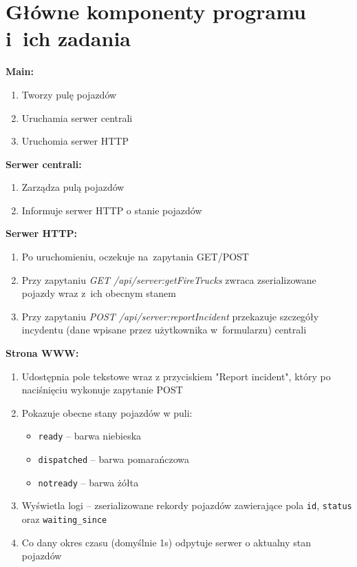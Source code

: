 \documentclass{article}
\begin{document}
\section{Główne komponenty programu i~ich zadania}
\textbf{Main:}
\begin{enumerate}
	\item Tworzy pulę pojazdów
	\item Uruchamia serwer centrali
	\item Uruchomia serwer HTTP
\end{enumerate}

\textbf{Serwer centrali:}
\begin{enumerate}
	\item Zarządza pulą pojazdów
	\item Informuje serwer HTTP o stanie pojazdów
\end{enumerate}

\textbf{Serwer HTTP:}
\begin{enumerate}
	\item Po uruchomieniu, oczekuje na~zapytania GET/POST
	\item Przy zapytaniu \emph{GET /api/server:getFireTrucks} zwraca zserializowane pojazdy wraz z~ich obecnym stanem
	\item Przy zapytaniu \emph{POST /api/server:reportIncident} przekazuje szczegóły incydentu (dane wpisane przez użytkownika w~formularzu) centrali
\end{enumerate}

\textbf{Strona WWW:}
\begin{enumerate}
	\item Udostępnia pole tekstowe wraz z przyciskiem "Report incident", który po naciśnięciu wykonuje zapytanie POST
	\item Pokazuje obecne stany pojazdów w puli:
		\begin{itemize}
			\item \texttt{ready} -- barwa niebieska
			\item \texttt{dispatched} -- barwa pomarańczowa
			\item \texttt{notready} -- barwa żółta
		\end{itemize}
	\item Wyświetla logi -- zserializowane rekordy pojazdów zawierające pola \texttt{id}, \texttt{status} oraz \texttt{waiting\_since}
	\item Co dany okres czasu (domyślnie 1s) odpytuje serwer o aktualny stan pojazdów
\end{enumerate}
\end{document}
